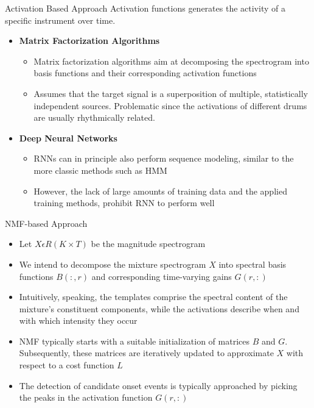 \begin{frame}[t,fragile]{ Activation Based Approach}
Activation functions generates the activity of a specific instrument over time.
\begin{itemize}
\item \textbf{Matrix Factorization Algorithms}
\begin{itemize}
\item Matrix factorization algorithms aim at decomposing the spectrogram into basis functions and their corresponding activation functions
\item Assumes that the target signal is a superposition of multiple, statistically independent sources. Problematic since the activations of different drums are usually rhythmically related.
\end{itemize}

\item \textbf{Deep Neural Networks}
\begin{itemize}
\item RNNs can in principle also perform sequence modeling, similar to the more classic methods such as HMM
\item However, the lack of large amounts of training data and the applied training methods, prohibit RNN to perform well
\end{itemize}
\end{itemize}
\end{frame} 

\begin{frame}[t,fragile]{NMF-based Approach}
\begin{itemize}
\item Let $ X \epsilon R(K \times T) $  be the magnitude spectrogram
\item We intend to decompose the mixture spectrogram $X$ into spectral basis functions $B(:,r)$ and corresponding time-varying gains $G(r, :)$
\item Intuitively, speaking, the templates comprise the spectral content of the mixture’s constituent components, while the activations describe when and with which intensity they occur
\item NMF typically starts with a suitable initialization of matrices $B$ and $G$. Subsequently, these matrices are iteratively updated to approximate $X$ with respect to a cost function $L$
\item The detection of candidate onset events is typically approached by picking the peaks in the activation function $G (r, :)$
\end{itemize}
\end{frame}


